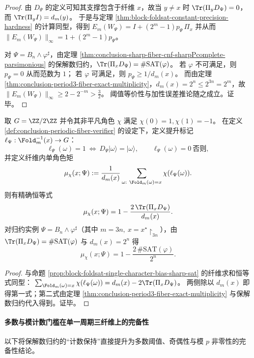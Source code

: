 \begin{proof}
由 \(D_\Psi\) 的定义可知其支撑包含于纤维 \(x\)，故当 \(y\neq x\) 时 \(\Tr(\Pi_yD_\Psi)=0\)，而 \(\Tr(\Pi_yI)=d_m(y)\)。
于是与定理 \ref{thm:block-foldsat-constant-precision-hardness} 的计算同型，得到
\(
E_m(W_\Psi)=I+(2^m-1)p_\Psi\,\Pi_x
\)
并从而 \(\|E_m(W_\Psi)\|_\infty=1+(2^m-1)p_\Psi\)。
\par
对 \(\Psi=B_n\wedge\varphi^\sharp\)，由定理 \ref{thm:conclusion-sharp-fiber-cnf-sharpPcomplete-parsimonious} 的保解数归约，\(\Tr(\Pi_xD_\Psi)=\#\mathrm{SAT}(\varphi)\)。
若 \(\varphi\) 不可满足，则 \(p_\Psi=0\) 从而范数为 \(1\)；
若 \(\varphi\) 可满足，则 \(p_\Psi\ge 1/d_m(x)\)。
而由定理 \ref{thm:conclusion-period3-fiber-exact-multiplicity}，\(d_m(x)=2^n\le 2^{3n}=2^m\)，故
\(
\|E_m(W_\Psi)\|_\infty\ge 2-2^{-m}>\tfrac32
\)。
阈值等价性与加性误差推论随之成立。证毕。
\end{proof}

\begin{proposition}\label{prop:conclusion-periodic-fiber-single-character-moment}
取 \(G=\ZZ/2\ZZ\) 并令其非平凡角色 \(\chi\) 满足 \(\chi(0)=1,\chi(1)=-1\)。
在定义 \ref{def:conclusion-periodic-fiber-verifier} 的设定下，定义提升标记 \(\ell_\Psi:\Fold_m^{-1}(x)\to G\)：
\[
\ell_\Psi(\omega)=1\ \Longleftrightarrow\ D_\Psi|\omega\rangle=|\omega\rangle,
\qquad
\ell_\Psi(\omega)=0\ \text{否则},
\]
并定义纤维内单角色矩
\[
\mu_\chi(x;\Psi):=\frac{1}{d_m(x)}\sum_{\omega:\ \Fold_m(\omega)=x}\chi(\ell_\Psi(\omega)).
\]
则有精确恒等式
\[
\mu_\chi(x;\Psi)=1-\frac{2\,\Tr(\Pi_xD_\Psi)}{d_m(x)}.
\]
对归约实例 \(\Psi=B_n\wedge\varphi^\sharp\)（其中 \(m=3n,\ x=x^\star\!\upharpoonright_{3n}\)），由 \(\Tr(\Pi_xD_\Psi)=\#\mathrm{SAT}(\varphi)\) 与 \(d_m(x)=2^n\) 得
\[
\mu_\chi(x;\Psi)=1-\frac{2\,\#\mathrm{SAT}(\varphi)}{2^n}.
\]
\end{proposition}

\begin{proof}
与命题 \ref{prop:block-foldsat-single-character-bias-sharp-sat} 的纤维求和恒等式同型：
\(
\sum_{\Fold_m(\omega)=x}\chi(\ell_\Psi(\omega))=d_m(x)-2\Tr(\Pi_xD_\Psi)
\)。
两侧除以 \(d_m(x)\) 即得第一式；第二式由定理 \ref{thm:conclusion-period3-fiber-exact-multiplicity} 与保解数归约代入得到。证毕。
\end{proof}

\paragraph{多数与模计数门槛在单一周期三纤维上的完备性}
以下将保解数归约的“计数保持”直接提升为多数阈值、奇偶性与模 \(p\) 非零性的完备性结论。

